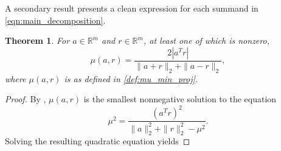 \documentclass{article}
\newtheorem{theorem}{Theorem}
\newcommand{\ts}{^T}
\begin{document}
A secondary result presents a clean expression for each summand in \cref{eqn:main_decomposition}.

\begin{theorem}\label{thm:rank_two_eigenvalue_problem}
    For $a\in \mathbb{R}^m$ and $r \in \mathbb{R}^m$, at least one of which is nonzero, 
    \begin{equation*}
        \mu(a,r) = \frac{2 |a\ts r|}{\|a+r\|_2 + \|a-r\|_2},
    \end{equation*}
    where $\mu(a,r)$ is as defined in \cref{def:mu_min_proj}.
\end{theorem}
\begin{proof}
    By , $\mu(a,r)$ is the smallest nonnegative solution to the equation
    \begin{equation*}
        \mu^2 = \frac{(a\ts r)^2}{\|a\|_2^2 + \|r\|_2^2 - \mu^2}.
    \end{equation*}
    Solving the resulting quadratic equation yields 

\end{proof}
\end{document}
